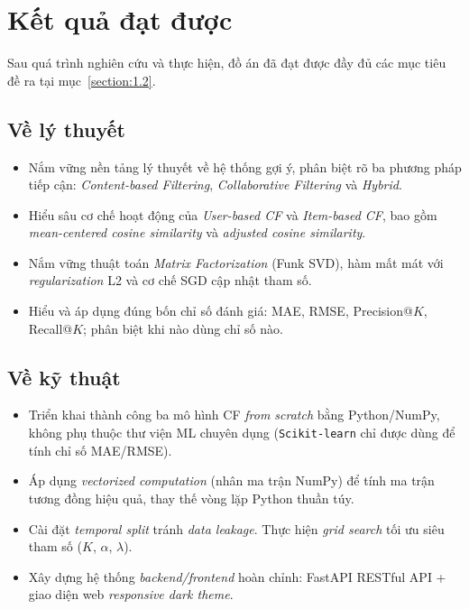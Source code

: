 \documentclass[../BTL.tex]{subfiles}
\begin{document}
\section{Kết quả đạt được}
\label{section:4.1}

Sau quá trình nghiên cứu và thực hiện, đồ án đã đạt được đầy đủ các mục tiêu
đề ra tại mục~\ref{section:1.2}.

\subsection{Về lý thuyết}
\label{section:4.1.1}

\begin{itemize}[itemsep=0.4em]
    \item Nắm vững nền tảng lý thuyết về hệ thống gợi ý, phân biệt rõ ba
    phương pháp tiếp cận: \textit{Content-based Filtering},
    \textit{Collaborative Filtering} và \textit{Hybrid}.

    \item Hiểu sâu cơ chế hoạt động của \textit{User-based CF} và
    \textit{Item-based CF}, bao gồm \textit{mean-centered cosine similarity}
    và \textit{adjusted cosine similarity}.

    \item Nắm vững thuật toán \textit{Matrix Factorization} (Funk SVD), hàm
    mất mát với \textit{regularization} L2 và cơ chế SGD cập nhật tham số.

    \item Hiểu và áp dụng đúng bốn chỉ số đánh giá: MAE, RMSE,
    Precision@$K$, Recall@$K$; phân biệt khi nào dùng chỉ số nào.
\end{itemize}

\subsection{Về kỹ thuật}
\label{section:4.1.2}

\begin{itemize}[itemsep=0.4em]
    \item Triển khai thành công ba mô hình CF \textit{from scratch} bằng
    Python/NumPy, không phụ thuộc thư viện ML chuyên dụng
    (\texttt{Scikit-learn} chỉ được dùng để tính chỉ số MAE/RMSE).

    \item Áp dụng \textit{vectorized computation} (nhân ma trận NumPy) để
    tính ma trận tương đồng hiệu quả, thay thế vòng lặp Python thuần túy.

    \item Cài đặt \textit{temporal split} tránh \textit{data leakage}.
    Thực hiện \textit{grid search} tối ưu siêu tham số ($K$, $\alpha$,
    $\lambda$).

    \item Xây dựng hệ thống \textit{backend/frontend} hoàn chỉnh: FastAPI
    RESTful API + giao diện web \textit{responsive dark theme}.
\end{itemize}
\end{document}
